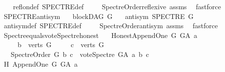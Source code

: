 \begin{isabellebody}
%
\isadelimproof
\ \ %
\endisadelimproof
%
\isatagproof
{}\isamarkupfalse%
\ refl{\isacharunderscore}{\kern0pt}on{\isacharunderscore}{\kern0pt}def\ SPECTRE{\isacharunderscore}{\kern0pt}def\ \isanewline
\ \ \isamarkupfalse%
\ Spectre{\isacharunderscore}{\kern0pt}Order{\isacharunderscore}{\kern0pt}reflexive\ assms\ \isamarkupfalse%
\ fastforce%
\endisatagproof
{\isafoldproof}%
%
\isadelimproof
\isanewline
%
\endisadelimproof
\isanewline
{}\isamarkupfalse%
\ SPECTRE{\isacharunderscore}{\kern0pt}antisym{\isacharcolon}{\kern0pt}\isanewline
\ \ \ {\isachardoublequoteopen}blockDAG\ G{\isachardoublequoteclose}\isanewline
\ \ \ {\isachardoublequoteopen}antisym\ {\isacharparenleft}{\kern0pt}SPECTRE\ G{\isacharparenright}{\kern0pt}{\isachardoublequoteclose}\ \isanewline
%
\isadelimproof
\ \ %
\endisadelimproof
%
\isatagproof
{}\isamarkupfalse%
\ antisym{\isacharunderscore}{\kern0pt}def\ SPECTRE{\isacharunderscore}{\kern0pt}def\ \isanewline
\ \ \isamarkupfalse%
\ Spectre{\isacharunderscore}{\kern0pt}Order{\isacharunderscore}{\kern0pt}antisym\ assms\ \isamarkupfalse%
\ fastforce%
\endisatagproof
{\isafoldproof}%
%
\isadelimproof
\isanewline
%
\endisadelimproof
\isanewline
\isanewline
{}\isamarkupfalse%
\ Spectre{\isacharunderscore}{\kern0pt}equals{\isacharunderscore}{\kern0pt}vote{\isacharunderscore}{\kern0pt}Spectre{\isacharunderscore}{\kern0pt}honest{\isacharcolon}{\kern0pt}\isanewline
\ \ \ {\isachardoublequoteopen}Honest{\isacharunderscore}{\kern0pt}Append{\isacharunderscore}{\kern0pt}One\ G\ G{\isacharunderscore}{\kern0pt}A\ a{\isachardoublequoteclose}\isanewline
\ \ \ \ \ {\isachardoublequoteopen}b\ {\isasymin}\ verts\ G{\isachardoublequoteclose}\isanewline
\ \ \ \ \ {\isachardoublequoteopen}c\ {\isasymin}\ verts\ G{\isachardoublequoteclose}\isanewline
\ \ \ {\isachardoublequoteopen}Spectre{\isacharunderscore}{\kern0pt}Order\ G\ b\ c\ {\isasymlongleftrightarrow}\ vote{\isacharunderscore}{\kern0pt}Spectre\ G{\isacharunderscore}{\kern0pt}A\ a\ b\ c\ {\isacharequal}{\kern0pt}\ {}{\isachardoublequoteclose}\isanewline
%
\isadelimproof
%
\endisadelimproof
%
\isatagproof
{}\isamarkupfalse%
\ {\isacharminus}{\kern0pt}\isanewline
\ \ \isamarkupfalse%
\ H{\isacharcolon}{\kern0pt}\ Append{\isacharunderscore}{\kern0pt}One\ {\isachardoublequoteopen}G{\isachardoublequoteclose}\ {\isachardoublequoteopen}G{\isacharunderscore}{\kern0pt}A{\isachardoublequoteclose}\ {\isachardoublequoteopen}a{\isachardoublequoteclose}\ \isamarkupfalse%

\end{isabellebody}
